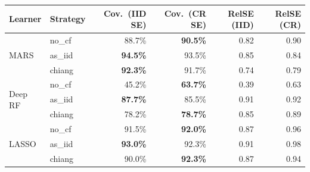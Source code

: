 \begin{tabular}{llrrrr}
\toprule
\textbf{Learner} & \textbf{Strategy} & \textbf{Cov.\ (IID SE)} & \textbf{Cov.\ (CR SE)} & \textbf{RelSE (IID)} & \textbf{RelSE (CR)} \\
\midrule
  \multirow{3}{*}{MARS} & no\_cf & 88.7\% & \textbf{90.5\%} & 0.82 & 0.90 \\
   & as\_iid & \textbf{94.5\%} & 93.5\% & 0.85 & 0.84 \\
   & chiang & \textbf{92.3\%} & 91.7\% & 0.74 & 0.79 \\
\midrule
  \multirow{3}{*}{Deep RF} & no\_cf & 45.2\% & \textbf{63.7\%} & 0.39 & 0.63 \\
   & as\_iid & \textbf{87.7\%} & 85.5\% & 0.91 & 0.92 \\
   & chiang & 78.2\% & \textbf{78.7\%} & 0.85 & 0.89 \\
\midrule
  \multirow{3}{*}{LASSO} & no\_cf & 91.5\% & \textbf{92.0\%} & 0.87 & 0.96 \\
   & as\_iid & \textbf{93.0\%} & 92.3\% & 0.91 & 0.98 \\
   & chiang & 90.0\% & \textbf{92.3\%} & 0.87 & 0.94 \\
\bottomrule
\end{tabular}